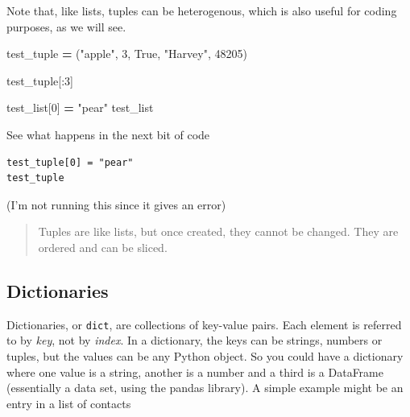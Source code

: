 \documentclass[
  letterpaper,
]{scrbook}
\newenvironment{Shaded}{\begin{snugshade}}{\end{snugshade}}
\newcommand{\DecValTok}[1]{\textcolor[rgb]{0.00,0.00,0.81}{#1}}
\newcommand{\NormalTok}[1]{#1}
\newcommand{\OperatorTok}[1]{\textcolor[rgb]{0.81,0.36,0.00}{\textbf{#1}}}
\newcommand{\StringTok}[1]{\textcolor[rgb]{0.31,0.60,0.02}{#1}}
\newcommand{\VariableTok}[1]{\textcolor[rgb]{0.00,0.00,0.00}{#1}}
\begin{document}
Note that, like lists, tuples can be heterogenous, which is also useful for coding purposes, as we will see.

\begin{Shaded}
\begin{Highlighting}[]
\NormalTok{test\_tuple }\OperatorTok{=}\NormalTok{ (}\StringTok{"apple"}\NormalTok{, }\DecValTok{3}\NormalTok{, }\VariableTok{True}\NormalTok{, }\StringTok{"Harvey"}\NormalTok{, }\DecValTok{48205}\NormalTok{)}
\end{Highlighting}
\end{Shaded}

\begin{Shaded}
\begin{Highlighting}[]
\NormalTok{test\_tuple[:}\DecValTok{3}\NormalTok{]}
\end{Highlighting}
\end{Shaded}

\begin{Shaded}
\begin{Highlighting}[]
\NormalTok{test\_list[}\DecValTok{0}\NormalTok{] }\OperatorTok{=} \StringTok{"pear"}
\NormalTok{test\_list}
\end{Highlighting}
\end{Shaded}

See what happens in the next bit of code

\begin{verbatim}
test_tuple[0] = "pear"
test_tuple
\end{verbatim}

(I'm not running this since it gives an error)

\begin{quote}
Tuples are like lists, but once created, they cannot be changed. They are ordered and can be sliced.
\end{quote}

\hypertarget{dictionaries}{%
\subsection{Dictionaries}\label{dictionaries}}

Dictionaries, or \texttt{dict}, are collections of key-value pairs. Each element is referred to by \emph{key}, not by \emph{index}. In a dictionary, the keys can be strings, numbers or tuples, but the values can be any Python object. So you could have a dictionary where one value is a string, another is a number and a third is a DataFrame (essentially a data set, using the pandas library). A simple example might be an entry in a list of contacts
\end{document}
